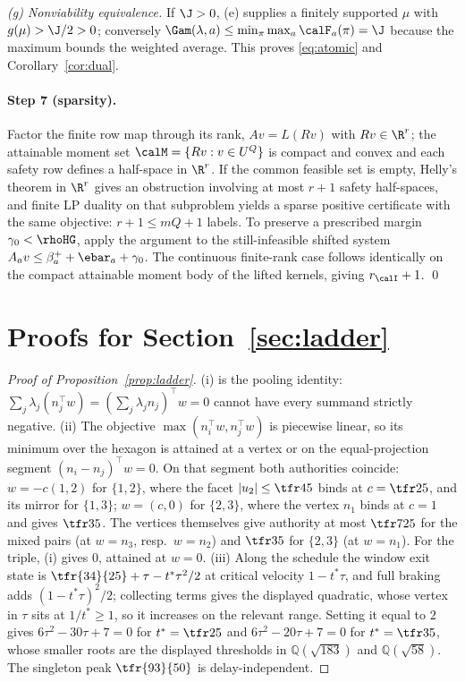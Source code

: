 \emph{(g) Nonviability equivalence.} If $\J>0$, (e) supplies a finitely supported $\mu$ with $g(\mu)>\J/2>0$; conversely $\Gam(\lambda,a)\le\min_\pi\max_a\calF_a(\pi)=\J$ because the maximum bounds the weighted average. This proves \eqref{eq:atomic} and Corollary~\ref{cor:dual}.

\paragraph{Step 7 (sparsity).}
Factor the finite row map through its rank, $Av=L(Rv)$ with $Rv\in\R^r$; the attainable moment set $\calM=\{Rv:v\in U^Q\}$ is compact and convex and each safety row defines a half-space in $\R^r$. If the common feasible set is empty, Helly's theorem in $\R^r$ gives an obstruction involving at most $r+1$ safety half-spaces, and finite LP duality on that subproblem \cite{Chvatal1983} yields a sparse positive certificate with the same objective: $r+1\le mQ+1$ labels. To preserve a prescribed margin $\gamma_0<\rhoHG$, apply the argument to the still-infeasible shifted system $A_av\le\beta^+_a+\ebar_a+\gamma_0$. The continuous finite-rank case follows identically on the compact attainable moment body of the lifted kernels, giving $r_\calI+1$. \qed

\section{Proofs for Section~\ref{sec:ladder}}\label{app:ladder}

\begin{proof}[Proof of Proposition~\ref{prop:ladder}]
(i) is the pooling identity: $\sum_j\lambda_j(n_j^\top w)=(\sum_j\lambda_jn_j)^\top w=0$ cannot have every summand strictly negative. (ii) The objective $\max(n_i^\top w,n_j^\top w)$ is piecewise linear, so its minimum over the hexagon is attained at a vertex or on the equal-projection segment $(n_i-n_j)^\top w=0$. On that segment both authorities coincide: $w=-c(1,2)$ for $\{1,2\}$, where the facet $|u_2|\le\tfr45$ binds at $c=\tfr25$, and its mirror for $\{1,3\}$; $w=(c,0)$ for $\{2,3\}$, where the vertex $n_1$ binds at $c=1$ and gives $\tfr35$. The vertices themselves give authority at most $\tfr7{25}$ for the mixed pairs (at $w=n_3$, resp.\ $w=n_2$) and $\tfr35$ for $\{2,3\}$ (at $w=n_1$). For the triple, (i) gives $0$, attained at $w=0$. (iii) Along the schedule the window exit state is $\tfr{34}{25}+\tau-t^\ast\tau^2/2$ at critical velocity $1-t^\ast\tau$, and full braking adds $(1-t^\ast\tau)^2/2$; collecting terms gives the displayed quadratic, whose vertex in $\tau$ sits at $1/t^\ast\ge1$, so it increases on the relevant range. Setting it equal to $2$ gives $6\tau^2-30\tau+7=0$ for $t^\ast=\tfr25$ and $6\tau^2-20\tau+7=0$ for $t^\ast=\tfr35$, whose smaller roots are the displayed thresholds in $\mathbb Q(\sqrt{183})$ and $\mathbb Q(\sqrt{58})$. The singleton peak $\tfr{93}{50}$ is delay-independent.
\end{proof}


